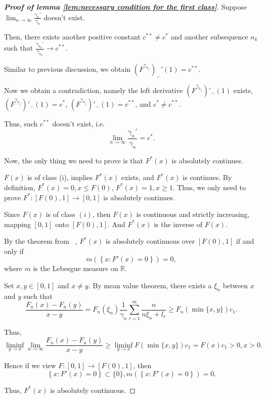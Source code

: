 \documentclass[12pt]{article}
\theoremstyle{plain}
\theoremstyle{definition}
\theoremstyle{remark}
\begin{document}
\begin{proof}[\textbf{Proof of lemma \ref{lem:necessary condition for the first class}}]
Suppose $\lim_{n\rightarrow \infty} \frac{\gamma_n'}{\gamma_n}$ doesn't exist.

Then, there exists another positive constant $c^{**}\neq c^*$ and another subsequence $n_k$ such that $\frac{\gamma_{n_k}'}{\gamma_{n_k}}\rightarrow c^{**}$.

Similar to previous discussion, we obtain $(F^{\gamma_{n_j}})_-'(1)=c^{**}$.

Now we obtain a contradiction, namely the left derivative $(F^{\gamma_{n_j}})'_-(1)$ exists, $(F^{\gamma_{n_j}})'_-(1)=c^*$, $(F^{\gamma_{n_j}})'_-(1)=c^{**}$, and $c^*\neq c^{**}$.

Thus, such $c^{**}$ doesn't exist, i.e. $$\lim_{n\rightarrow \infty} \frac{\gamma_n'}{\gamma_n}=c^*.$$


Now, the only thing we need to prove is that $F^*(x)$ is absolutely continues. 

$F(x)$ is of class (i), implies $F^*(x)$ exists, and $F^*(x)$ is continues. By definition,  $F^*(x)=0,x\leq F(0)$, $F^*(x)=1,x\geq 1$. Thus, we only need to prove $F^*:[F(0),1]\rightarrow [0,1]$ is absolutely continues.

Since $F(x)$ is of class $(i)$, then $F(x)$ is continuous and strictly increasing, mapping $[0,1]$ onto $[F(0),1]$. And $F^*(x)$ is the inverse of $F(x)$. 

By the theorem from ~\cite{abs}, $F^*(x)$ is absolutely continuous over $[F(0),1]$ if and only if
\begin{equation*}
    m\left(\left\{x : F'(x)=0\right\}\right)=0,
\end{equation*}
where $m$ is the Lebesgue measure on $\mathbb{R}$.


Set $x,y\in [0,1]$ and $x\neq y$. By mean value theorem, there exists a $\xi_n$ between $x$ and $y$ such that
\begin{equation*}
\dfrac{F_n(x)-F_n(y)}{x-y}=F_n(\xi_n)\frac{1}{\gamma_{n}} \sum_{r=1}^{m} \frac{n}{n\xi_n+l_{r}}\geq  F_n(\min\{x,y\})c_1.
\end{equation*}

Thus, 
\begin{equation*}
\liminf_{y\rightarrow x}\lim_{n\rightarrow \infty}\dfrac{F_n(x)-F_n(y)}{x-y}\geq \liminf_{y\rightarrow x} F(\min\{x,y\})c_1=F(x)c_1>0, x>0.
\end{equation*}

Hence if we view $F:[0,1]\rightarrow[F(0),1]$, then
\begin{equation*}
    \left\{x : F'(x)=0\right\}\subset \{0\}, m\left(\left\{x : F'(x)=0\right\}\right)=0.
\end{equation*}

Thus, $F^*(x)$ is absolutely continuous.

\end{proof}
\end{document}
